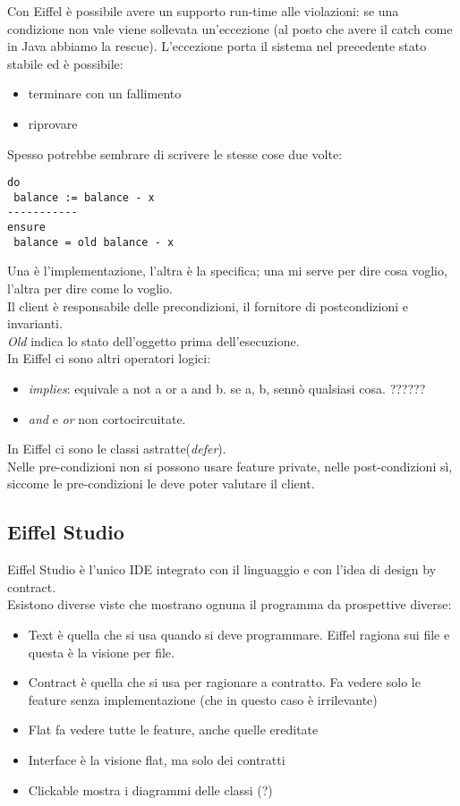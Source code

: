 \noindent Con Eiffel è possibile avere un supporto run-time alle violazioni:  se una condizione non vale viene sollevata un’eccezione (al posto che avere il catch come in Java abbiamo la rescue). L’eccezione porta il sistema nel precedente stato stabile ed è possibile:
\begin{itemize}
    \item terminare con un fallimento
    \item riprovare
\end{itemize}

Spesso potrebbe sembrare di scrivere le stesse cose due volte:
\begin{verbatim}
do
 balance := balance - x 
-----------
ensure
 balance = old balance - x
\end{verbatim}
Una è l'implementazione, l'altra è la specifica; una mi serve per dire cosa voglio, l'altra per dire come lo voglio.\\
Il client è responsabile delle precondizioni, il fornitore di postcondizioni e invarianti.\\
\textit{Old} indica lo stato dell'oggetto prima dell'esecuzione. \\

\noindent In Eiffel ci sono altri operatori logici:
\begin{itemize}
    \item \textit{implies}: equivale a not a or a and b. se a, b, sennò qualsiasi cosa. ??????
    \item \textit{and} e \textit{or} non cortocircuitate.
\end{itemize} 
In Eiffel ci sono le classi astratte(\textit{defer}).\\
Nelle pre-condizioni non si possono usare feature private, nelle post-condizioni sì, siccome le pre-condizioni le deve poter valutare il client.
\subsection{Eiffel Studio}
Eiffel Studio è l'unico IDE integrato con il linguaggio e con l'idea di design by contract.\\
Esistono diverse viste che mostrano ognuna il programma da prospettive diverse:
\begin{itemize}
    \item Text è quella che si usa quando si deve programmare. Eiffel ragiona sui file e questa è la visione per file.
    \item Contract è quella che si usa per ragionare a contratto. Fa vedere solo le feature senza implementazione (che in questo caso è irrilevante)
    \item Flat fa vedere tutte le feature, anche quelle ereditate
    \item Interface è la visione flat, ma solo dei contratti
    \item Clickable mostra i diagrammi delle classi (?)
\end{itemize}

